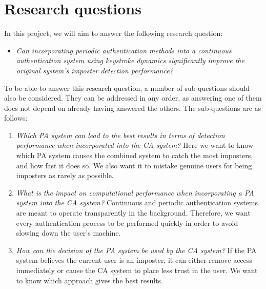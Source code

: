 \documentclass[informationsecurity]{gucmasterproject}
\begin{document}
\section{Research questions}
\label{research:questions}
In this project, we will aim to answer the following research question:
\begin{itemize}
    \item \textit{Can incorporating periodic authentication methods into a continuous authentication system using keystroke dynamics significantly improve the original system's imposter detection performance?}
\end{itemize}
To be able to answer this research question, a number of sub-questions should also be considered.
They can be addressed in any order, as answering one of them does not depend on already having answered the others.
The sub-questions are as follows:
\begin{enumerate}
\item \textit{Which PA system can lead to the best results in terms of detection performance when incorporated into the CA system?} Here we want to know which PA system causes the combined system to catch the most imposters, and how fast it does so. We also want it to mistake genuine users for being imposters as rarely as possible.
\item \textit{What is the impact on computational performance when incorporating a PA system into the CA system?} Continuous and periodic authentication systems are meant to operate transparently in the background. Therefore, we want every authentication process to be performed quickly in order to avoid slowing down the user's machine.
\item \textit{How can the decision of the PA system be used by the CA system?} If the PA system believes the current user is an imposter, it can either remove access immediately or cause the CA system to place less trust in the user. We want to know which approach gives the best results.

\end{enumerate}
\end{document}
